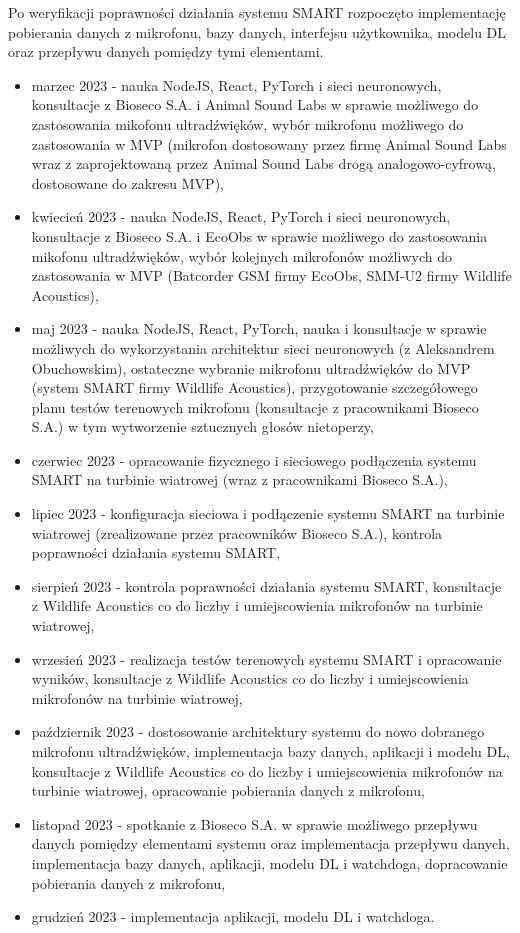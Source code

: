 \documentclass{sprz}
\begin{document}
Po weryfikacji poprawności działania systemu SMART rozpoczęto implementację pobierania danych z mikrofonu, bazy danych, interfejsu użytkownika, modelu DL oraz przepływu danych pomiędzy tymi elementami.

\begin{itemize}
  \item{marzec 2023 - nauka NodeJS, React, PyTorch i sieci neuronowych, konsultacje z Bioseco S.A. i Animal Sound Labs w sprawie możliwego do zastosowania mikofonu ultradźwięków, wybór mikrofonu możliwego do zastosowania w MVP (mikrofon dostosowany przez firmę Animal Sound Labs wraz z zaprojektowaną przez Animal Sound Labs drogą analogowo-cyfrową, dostosowane do zakresu MVP),}
  \item{kwiecień 2023 - nauka NodeJS, React, PyTorch i sieci neuronowych, konsultacje z Bioseco S.A. i EcoObs w sprawie możliwego do zastosowania mikofonu ultradźwięków, wybór kolejnych mikrofonów możliwych do zastosowania w MVP (Batcorder GSM firmy EcoObs, SMM-U2 firmy Wildlife Acoustics),}
  \item{maj 2023 - nauka NodeJS, React, PyTorch, nauka i konsultacje w sprawie możliwych do wykorzystania architektur sieci neuronowych (z Aleksandrem Obuchowskim), ostateczne wybranie mikrofonu ultradźwięków do MVP (system SMART firmy Wildlife Acoustics), przygotowanie szczegółowego planu testów terenowych mikrofonu (konsultacje z pracownikami Bioseco S.A.) w tym wytworzenie sztucznych głosów nietoperzy,}
  \item{czerwiec 2023 - opracowanie fizycznego i sieciowego podłączenia systemu SMART na turbinie wiatrowej (wraz z pracownikami Bioseco S.A.),}
  \item{lipiec 2023 - konfiguracja sieciowa i podłączenie systemu SMART na turbinie wiatrowej (zrealizowane przez pracowników Bioseco S.A.), kontrola poprawności działania systemu SMART,}
  \item{sierpień 2023 - kontrola poprawności działania systemu SMART, konsultacje z Wildlife Acoustics co do liczby i umiejscowienia mikrofonów na turbinie wiatrowej,}
  \item{wrzesień 2023 - realizacja testów terenowych systemu SMART i opracowanie wyników, konsultacje z Wildlife Acoustics co do liczby i umiejscowienia mikrofonów na turbinie wiatrowej,}
  \item{październik 2023 - dostosowanie architektury systemu do nowo dobranego mikrofonu ultradźwięków, implementacja bazy danych, aplikacji i modelu DL, konsultacje z Wildlife Acoustics co do liczby i umiejscowienia mikrofonów na turbinie wiatrowej, opracowanie pobierania danych z mikrofonu,}
  \item {listopad 2023 - spotkanie z Bioseco S.A. w sprawie możliwego przepływu danych pomiędzy elementami systemu oraz implementacja przepływu danych, implementacja bazy danych, aplikacji, modelu DL i watchdoga, dopracowanie pobierania danych z mikrofonu,}
  \item {grudzień 2023 - implementacja aplikacji, modelu DL i watchdoga.}
  \end{itemize}
\end{document}
